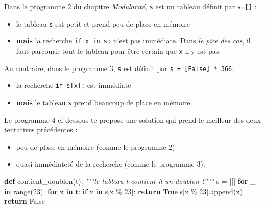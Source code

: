 \documentclass[a4paper,17pt]{extarticle}
\newenvironment{formule}%
{\begin{form}\color{bleuamu}}
{\end{form}}
\providecommand{\tightlist}{%
      \setlength{\itemsep}{0pt}\setlength{\parskip}{0pt}}
\newenvironment{Shaded}{}{}
\newcommand{\KeywordTok}[1]{\textcolor[rgb]{0.00,0.44,0.13}{\textbf{{#1}}}}
\newcommand{\DecValTok}[1]{\textcolor[rgb]{0.25,0.63,0.44}{{#1}}}
\newcommand{\CommentTok}[1]{\textcolor[rgb]{0.38,0.63,0.69}{\textit{{#1}}}}
\newcommand{\NormalTok}[1]{{#1}}
\newcommand{\VariableTok}[1]{\textcolor[rgb]{0.10,0.09,0.49}{{#1}}}
\newcommand{\ControlFlowTok}[1]{\textcolor[rgb]{0.00,0.44,0.13}{\textbf{{#1}}}}
\newcommand{\OperatorTok}[1]{\textcolor[rgb]{0.40,0.40,0.40}{{#1}}}
\newcommand{\BuiltInTok}[1]{{#1}}
\begin{document}
\begin{formule}
    Dans le programme 2 du chapitre \emph{Modularité}, \texttt{s} est un
tableau définit par \texttt{s={[}{]}} :

\begin{itemize}
\tightlist
\item
  le tableau \texttt{s} est petit et prend peu de place en mémoire
\item
  \textbf{mais} la recherche \texttt{if\ x\ in\ s:} n'est pas immédiate.
  Dans \emph{le pire des cas}, il faut parcourir tout le tableau pour
  être certain que \texttt{x} n'y est pas.
\end{itemize}

Au contraire, dans le programme 3, \texttt{s} est définit par
\texttt{s\ =\ {[}False{]}\ *\ 366}:

\begin{itemize}
\tightlist
\item
  la recherche \texttt{if\ s{[}x{]}:} est immédiate
\item
  \textbf{mais} le tableau \texttt{s} prend beaucoup de place en
  mémoire.
\end{itemize}

        \end{formule}\begin{retenir}
    Le programme 4 ci-dessous te propose une solution qui prend le meilleur
des deux tentatives précédentes :

\begin{itemize}
\tightlist
\item
  peu de place en mémoire (comme le programme 2)
\item
  quasi immédiateté de la recherche (comme le programme 3).
\end{itemize}

\begin{Shaded}
\begin{Highlighting}[]

\KeywordTok{def}\NormalTok{ contient\_doublon(t):}
    \CommentTok{"""le tableau t contient{-}il un doublon ?"""}
\NormalTok{    s }\OperatorTok{=}\NormalTok{ [[] }\ControlFlowTok{for}\NormalTok{ \_ }\KeywordTok{in} \BuiltInTok{range}\NormalTok{(}\DecValTok{23}\NormalTok{)]}
    \ControlFlowTok{for}\NormalTok{ x }\KeywordTok{in}\NormalTok{ t:}
        \ControlFlowTok{if}\NormalTok{ x }\KeywordTok{in}\NormalTok{ s[x }\OperatorTok{\%} \DecValTok{23}\NormalTok{]:}
            \ControlFlowTok{return} \VariableTok{True}
\NormalTok{        s[x }\OperatorTok{\%} \DecValTok{23}\NormalTok{].append(x)}
    \ControlFlowTok{return} \VariableTok{False}
\end{Highlighting}
\end{Shaded}


\end{retenir}
\end{document}
